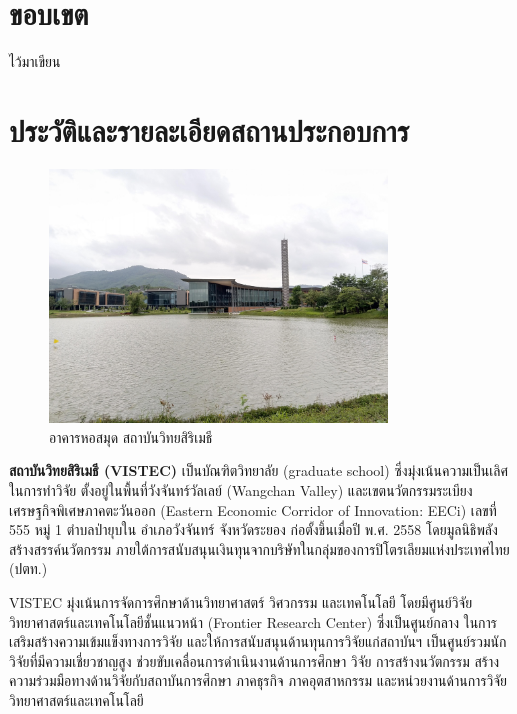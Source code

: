 \documentclass[16pt,a4]{internshipreport}
\begin{document}
\section{ขอบเขต}
ไว้มาเขียน

\section{ประวัติและรายละเอียดสถานประกอบการ}

\begin{figure}[H]
    \centering
    \includegraphics[width=0.8\textwidth]{images/vistec_v.jpg}
    \caption{อาคารหอสมุด สถาบันวิทยสิริเมธี}
\end{figure}

\textbf{สถาบันวิทยสิริเมธี (VISTEC)} เป็นบัณฑิตวิทยาลัย (graduate school) ซึ่งมุ่งเน้นความเป็นเลิศในการทำวิจัย ตั้งอยู่ในพื้นที่วังจันทร์วัลเลย์ (Wangchan Valley) และเขตนวัตกรรมระเบียงเศรษฐกิจพิเศษภาคตะวันออก (Eastern Economic Corridor of Innovation: EECi) เลขที่ 555 หมู่ 1 ตำบลป่ายุบใน อำเภอวังจันทร์ จังหวัดระยอง ก่อตั้งขึ้นเมื่อปี พ.ศ. 2558 โดยมูลนิธิพลังสร้างสรรค์นวัตกรรม ภายใต้การสนับสนุนเงินทุนจากบริษัทในกลุ่มของการปิโตรเลียมแห่งประเทศไทย (ปตท.)

VISTEC มุ่งเน้นการจัดการศึกษาด้านวิทยาศาสตร์ วิศวกรรม และเทคโนโลยี โดยมีศูนย์วิจัยวิทยาศาสตร์และเทคโนโลยีชั้นแนวหน้า (Frontier Research Center) ซึ่งเป็นศูนย์กลาง ในการเสริมสร้างความเข้มแข็งทางการวิจัย และให้การสนับสนุนด้านทุนการวิจัยแก่สถาบันฯ เป็นศูนย์รวมนักวิจัยที่มีความเชี่ยวชาญสูง ช่วยขับเคลื่อนการดำเนินงานด้านการศึกษา วิจัย การสร้างนวัตกรรม สร้างความร่วมมือทางด้านวิจัยกับสถาบันการศึกษา ภาคธุรกิจ ภาคอุตสาหกรรม
และหน่วยงานด้านการวิจัยวิทยาศาสตร์และเทคโนโลยี
\end{document}
